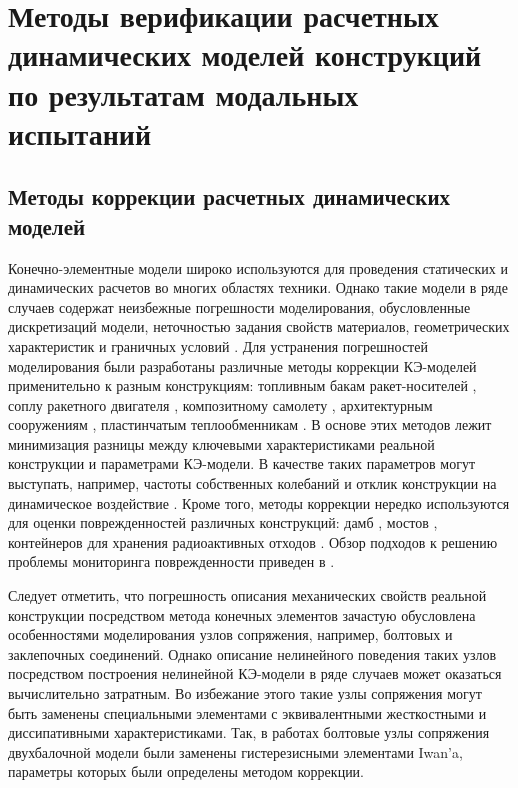 \chapter{Методы верификации расчетных динамических моделей конструкций по результатам модальных испытаний}


\section{Методы коррекции расчетных динамических моделей} 

Конечно-элементные модели широко используются для проведения статических и динамических расчетов во многих областях техники. Однако такие модели в ряде случаев содержат неизбежные погрешности моделирования, обусловленные дискретизаций модели, неточностью задания свойств материалов, геометрических характеристик и граничных условий \cite{lib:modelUpdating:Bartilson}. Для устранения погрешностей моделирования были разработаны различные методы коррекции КЭ-моделей применительно к разным конструкциям: топливным бакам ракет-носителей \cite{lib:modelUpdating:Li&Tian}, соплу ракетного двигателя \cite{lib:modelUpdating:Yan&Li}, композитному самолету \cite{lib:modelUpdating:Zhao&Gupta}, архитектурным сооружениям \cite{lib:modelUpdating:Girardi&Padovani}, пластинчатым теплообменникам \cite{lib:modelUpdating:Guo&Wang}. В основе этих методов лежит минимизация разницы между ключевыми характеристиками реальной конструкции и параметрами КЭ-модели. В качестве таких параметров могут выступать, например, частоты собственных колебаний и отклик конструкции на динамическое воздействие \cite{lib:modelUpdating:Petersen&Oiseth}. Кроме того, методы коррекции нередко используются для оценки поврежденностей различных конструкций: дамб \cite{lib:modelUpdating:Bayraktar&Sevim}, мостов \cite{lib:modelUpdating:Cong&Thoi, lib:modelUpdating:Polanco}, контейнеров для хранения радиоактивных отходов \cite{lib:modelUpdating:Eiras}. Обзор подходов к решению проблемы мониторинга поврежденности приведен в \cite{lib:modelUpdating:Simoen}. 

Следует отметить, что погрешность описания механических свойств реальной конструкции посредством метода конечных элементов зачастую обусловлена особенностями моделирования узлов сопряжения, например, болтовых и заклепочных соединений. Однако описание нелинейного поведения таких узлов посредством построения нелинейной КЭ-модели в ряде случаев может оказаться вычислительно затратным. Во избежание этого такие узлы сопряжения могут быть заменены специальными элементами с эквивалентными жесткостными и диссипативными характеристиками. Так, в работах \cite{lib:modelUpdating:Lacayo, lib:modelUpdating:Yuan} болтовые узлы сопряжения двухбалочной модели были заменены гистерезисными элементами Iwan’a, параметры которых были определены методом коррекции. 

